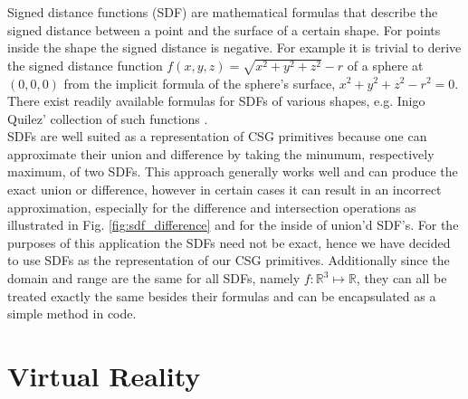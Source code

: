 Signed distance functions (SDF) are mathematical formulas that describe the signed distance between a point and the surface of a certain shape. For points inside the shape the
signed distance is negative. For example it is trivial to derive the signed distance function $f(x,y,z) = \sqrt{x^2 + y^2 + z^2} - r$ of a sphere at $(0, 0, 0)$ from the implicit formula of the sphere's surface, $x^2 + y^2 + z^2 - r^2 = 0$. There exist readily available formulas for SDFs of various shapes, e.g. Inigo Quilez' collection of such functions \cite{sdf_collection}.\\
SDFs are well suited as a representation of CSG primitives because one can approximate their union and difference by taking the minumum, respectively maximum, of two SDFs. This approach generally works
well and can produce the exact union or difference, however in certain cases it can result in an incorrect approximation, especially for the difference and intersection operations as illustrated in Fig. \ref{fig:sdf_difference} and for the inside of union'd SDF's.
For the purposes of this application the SDFs need not be exact, hence we have decided to use SDFs as the representation of our CSG primitives. Additionally since the domain and range are the same for all SDFs, namely
$f\colon \mathbb{R}^3 \mapsto \mathbb{R}$, they can all be treated exactly the same besides their formulas and can be encapsulated as a simple method in code.


\section{Virtual Reality}

